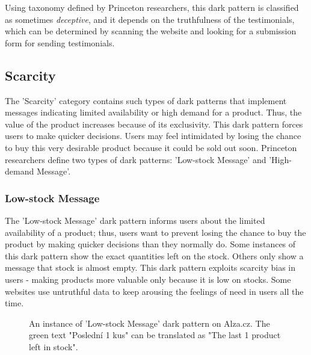                 Using taxonomy defined by Princeton researchers, this dark pattern is classified as sometimes \emph{deceptive}, and it depends on the truthfulness of the testimonials, which can be determined by scanning the website and looking for a submission form for sending testimonials.
        
        
            \subsection{Scarcity}
            The 'Scarcity' category contains such types of dark patterns that implement messages indicating limited availability or high demand for a product. Thus, the value of the product increases because of its exclusivity. This dark pattern forces users to make quicker decisions. Users may feel intimidated by losing the chance to buy this very desirable product because it could be sold out soon. Princeton researchers define two types of dark patterns: 'Low-stock Message' and 'High-demand Message'.
                \subsubsection{Low-stock Message}
                The 'Low-stock Message' dark pattern informs users about the limited availability of a product; thus, users want to prevent losing the chance to buy the product by making quicker decisions than they normally do. Some instances of this dark pattern show the exact quantities left on the stock. Others only show a message that stock is almost empty. This dark pattern exploits scarcity bias in users - making products more valuable only because it is low on stocks. Some websites use untruthful data to keep arousing the feelings of need in users all the time.
        
                \begin{figure}[ht]
                    \centering
                    \caption{An instance of 'Low-stock Message' dark pattern on Alza.cz. The green text "Poslední 1 kus" can be translated as "The last 1 product left in stock".}
                    \label{fig:low-stock-messages-alza1}
                \end{figure}
        
